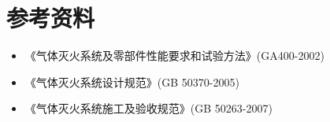 \documentclass[12pt,UTF8]{ctexbook}
\begin{document}
\chapter{参考资料}

\begin{itemize}[leftmargin=2em]
    \item 《气体灭火系统及零部件性能要求和试验方法》(GA400-2002)
    \item 《气体灭火系统设计规范》(GB 50370-2005)
    \item 《气体灭火系统施工及验收规范》(GB 50263-2007)
\end{itemize}

\backmatter
\end{document}
